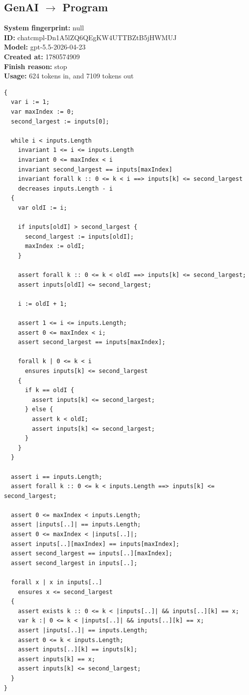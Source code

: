 \documentclass{article}
\begin{document}
\subsection*{GenAI $\rightarrow$ Program}
\textbf{System fingerprint: }null
\\\textbf{ID: }chatcmpl-Dn1A5lZQ6QEgKW4UTTBZtB5jHWMUJ
\\\textbf{Model: }gpt-5.5-2026-04-23
\\\textbf{Created at: }1780574909
\\\textbf{Finish reason: }stop
\\\textbf{Usage: }624 tokens in, and 7109 tokens out
\begin{lstlisting}
{
  var i := 1;
  var maxIndex := 0;
  second_largest := inputs[0];

  while i < inputs.Length
    invariant 1 <= i <= inputs.Length
    invariant 0 <= maxIndex < i
    invariant second_largest == inputs[maxIndex]
    invariant forall k :: 0 <= k < i ==> inputs[k] <= second_largest
    decreases inputs.Length - i
  {
    var oldI := i;

    if inputs[oldI] > second_largest {
      second_largest := inputs[oldI];
      maxIndex := oldI;
    }

    assert forall k :: 0 <= k < oldI ==> inputs[k] <= second_largest;
    assert inputs[oldI] <= second_largest;

    i := oldI + 1;

    assert 1 <= i <= inputs.Length;
    assert 0 <= maxIndex < i;
    assert second_largest == inputs[maxIndex];

    forall k | 0 <= k < i
      ensures inputs[k] <= second_largest
    {
      if k == oldI {
        assert inputs[k] <= second_largest;
      } else {
        assert k < oldI;
        assert inputs[k] <= second_largest;
      }
    }
  }

  assert i == inputs.Length;
  assert forall k :: 0 <= k < inputs.Length ==> inputs[k] <= second_largest;

  assert 0 <= maxIndex < inputs.Length;
  assert |inputs[..]| == inputs.Length;
  assert 0 <= maxIndex < |inputs[..]|;
  assert inputs[..][maxIndex] == inputs[maxIndex];
  assert second_largest == inputs[..][maxIndex];
  assert second_largest in inputs[..];

  forall x | x in inputs[..]
    ensures x <= second_largest
  {
    assert exists k :: 0 <= k < |inputs[..]| && inputs[..][k] == x;
    var k :| 0 <= k < |inputs[..]| && inputs[..][k] == x;
    assert |inputs[..]| == inputs.Length;
    assert 0 <= k < inputs.Length;
    assert inputs[..][k] == inputs[k];
    assert inputs[k] == x;
    assert inputs[k] <= second_largest;
  }
}
\end{lstlisting}
\end{document}
